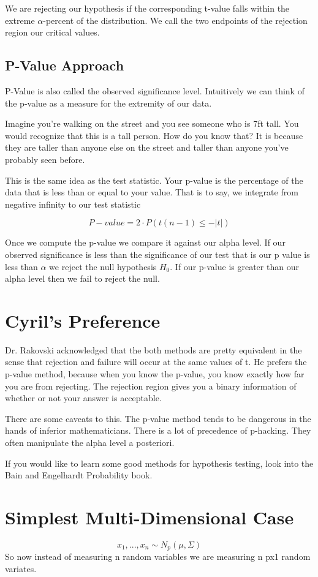 We are rejecting our hypothesis if the corresponding t-value falls within the extreme $\alpha$-percent of the distribution. We call the two endpoints of the rejection region our critical values.

\subsection{P-Value Approach}
P-Value is also called the observed significance level. 
Intuitively we can think of the p-value as a measure for the extremity of our data. 

Imagine you're walking on the street and you see someone who is 7ft tall. You would recognize that this is a tall person. How do you know that? It is because they are taller than anyone else on the street and taller than anyone you've probably seen before.

This is the same idea as the test statistic. Your p-value is the percentage of the data that is less than or equal to your value. That is to say, we integrate from negative infinity to our test statistic

\[ P-value = 2\cdot P(t(n-1) \leq -|t|)\]

Once we compute the p-value we compare it against our alpha level. If our observed significance is less than the significance of our test that is our p value is less than $\alpha$ we reject the null hypothesis $H_0$.
If our p-value is greater than our alpha level then we fail to reject the null. 

\section{Cyril's Preference}
Dr. Rakovski acknowledged that the both methods are pretty equivalent in the sense that rejection and failure will occur at the same values of t. He prefers the p-value method, because when you know the p-value, you know exactly how far you are from rejecting. The rejection region gives you a binary information of whether or not your answer is acceptable. 

There are some caveats to this. The p-value method tends to be dangerous in the hands of inferior mathematicians. There is a lot of precedence of p-hacking. They often manipulate the alpha level a posteriori.

If you would like to learn some good methods for hypothesis testing, look into the Bain and Engelhardt Probability book.

\section{Simplest Multi-Dimensional Case}
\[x_1,...,x_n \sim N_p(\mu, \Sigma)\]
So now instead of measuring n random variables we are measuring n px1 random variates. 

